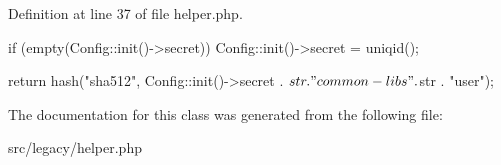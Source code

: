 \-Definition at line 37 of file helper.\-php.


\begin{DoxyCode}
    {
        if (empty(Config::init()->secret)) {
            Config::init()->secret = uniqid();
        }

        return hash("sha512", Config::init()->secret . $str . "common-libs" . 
      $str . "user");
    }
\end{DoxyCode}


\-The documentation for this class was generated from the following file\-:\begin{DoxyCompactItemize}
\item 
src/legacy/helper.\-php\end{DoxyCompactItemize}
